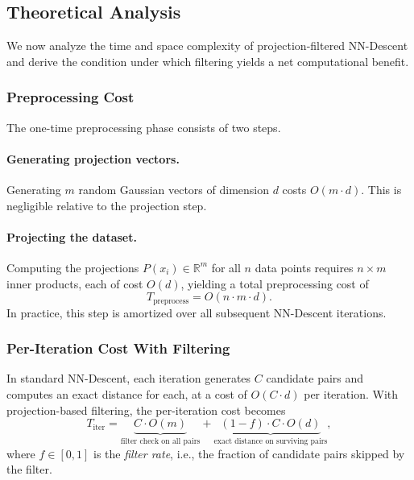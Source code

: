 \subsection{Theoretical Analysis}
\label{sec:analysis}

We now analyze the time and space complexity of projection-filtered NN-Descent and derive the condition under which filtering yields a net computational benefit.

\subsubsection{Preprocessing Cost}
\label{sec:preprocessing}

The one-time preprocessing phase consists of two steps.

\paragraph{Generating projection vectors.}
Generating $m$ random Gaussian vectors of dimension $d$ costs $O(m \cdot d)$. This is negligible relative to the projection step.

\paragraph{Projecting the dataset.}
Computing the projections $P(x_i) \in \mathbb{R}^m$ for all $n$ data points requires $n \times m$ inner products, each of cost $O(d)$, yielding a total preprocessing cost of
\begin{equation}
    T_{\text{preprocess}} = O(n \cdot m \cdot d).
    \label{eq:preprocess}
\end{equation}
In practice, this step is amortized over all subsequent NN-Descent iterations.

\subsubsection{Per-Iteration Cost With Filtering}
\label{sec:per_iteration}

In standard NN-Descent, each iteration generates $C$ candidate pairs and computes an exact distance for each, at a cost of $O(C \cdot d)$ per iteration. With projection-based filtering, the per-iteration cost becomes
\begin{equation}
    T_{\text{iter}} = \underbrace{C \cdot O(m)}_{\text{filter check on all pairs}} + \underbrace{(1 - f) \cdot C \cdot O(d)}_{\text{exact distance on surviving pairs}},
    \label{eq:iter_cost}
\end{equation}
where $f \in [0,1]$ is the \emph{filter rate}, i.e., the fraction of candidate pairs skipped by the filter.

